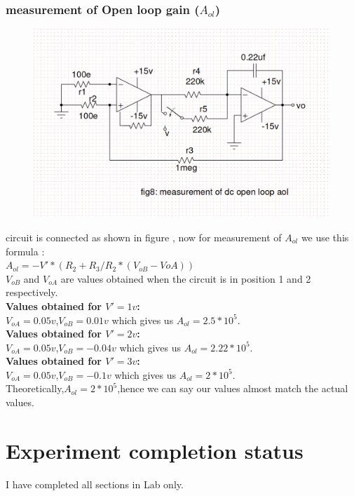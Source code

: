 \documentclass[12pt]{article}
\begin{document}
\subsubsection{ measurement of Open loop gain (\(A_{ol}\))}
\begin{figure}[h!]
\centering
\includegraphics[scale = 0.4]{q2.png}
\end{figure}
circuit is connected as shown in figure , now for measurement of \(A_{ol}\) we use this formula :\\
\(A_{ol}=-V'*(R_{2}+R_{3}/R_{2}*(V_{oB}-V{oA}))\)\\
\(V_{oB}\) and \(V_{oA}\) are values obtained when the circuit is in position 1 and 2 respectively.\\
\textbf{Values obtained for \(V'=1v\):\\}
\(V_{oA}=0.05v\),\(V_{oB}=0.01v\) which gives us \(A_{ol}=2.5*10^{5}\).\\
\textbf{Values obtained for \(V'=2v\):\\}
\(V_{oA}=0.05v\),\(V_{oB}=-0.04v\) which gives us \(A_{ol}=2.22*10^{5}\).\\
\textbf{Values obtained for \(V'=3v\):\\}
\(V_{oA}=0.05v\),\(V_{oB}=-0.1v\) which gives us \(A_{ol}=2*10^{5}\).\\
Theoretically,\(A_{ol}=2*10^{5}\),hence we can say our values almost match the actual values.
\section{Experiment completion status}
I have completed all sections in Lab only.
\end{document}
